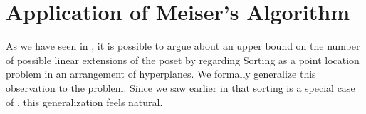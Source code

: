 \chapter{Application of Meiser's Algorithm}

As we have seen in , it is possible to argue about an
upper bound on the number of possible linear extensions of the poset \XY by
regarding Sorting \XY as a point location problem in an
arrangement of hyperplanes. We formally generalize this observation
to the \kSUM problem. Since we saw earlier in  that
sorting \XY is a special case of \fourLDT, this generalization feels natural.
